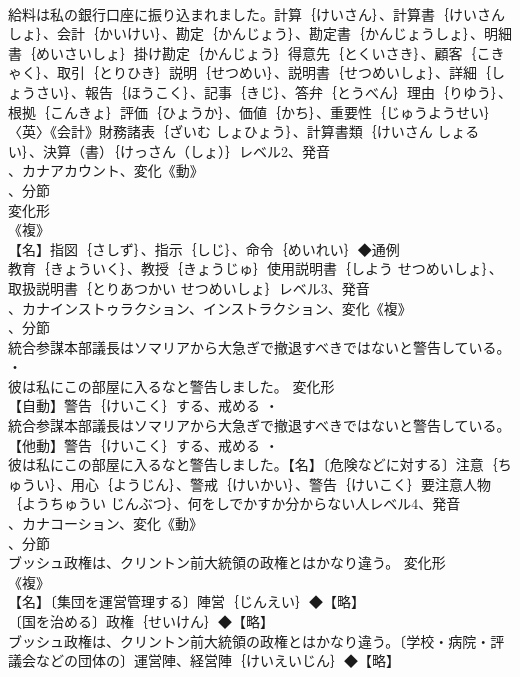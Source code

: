 \documentclass[8pt]{extreport}
\begin{document}
\begin{CJK}{UTF8}{min}
\\	給料は私の銀行口座に振り込まれました。計算｛けいさん｝、計算書｛けいさんしょ｝、会計｛かいけい｝、勘定｛かんじょう｝、勘定書｛かんじょうしょ｝、明細書｛めいさいしょ｝掛け勘定｛かんじょう｝得意先｛とくいさき｝、顧客｛こきゃく｝、取引｛とりひき｝説明｛せつめい｝、説明書｛せつめいしょ｝、詳細｛しょうさい｝、報告｛ほうこく｝、記事｛きじ｝、答弁｛とうべん｝理由｛りゆう｝、根拠｛こんきょ｝評価｛ひょうか｝、価値｛かち｝、重要性｛じゅうようせい｝
\\	〈英〉《会計》財務諸表｛ざいむ しょひょう｝、計算書類｛けいさん しょるい｝、決算（書）｛けっさん（しょ）｝レベル2、発音
\\	、カナアカウント、変化《動》
\\	、分節
\\	変化形 
\\	《複》
\\	【名】指図｛さしず｝、指示｛しじ｝、命令｛めいれい｝◆通例
\\	教育｛きょういく｝、教授｛きょうじゅ｝使用説明書｛しよう せつめいしょ｝、取扱説明書｛とりあつかい せつめいしょ｝レベル3、発音
\\	、カナインストゥラクション、インストラクション、変化《複》
\\	、分節
\\	統合参謀本部議長はソマリアから大急ぎで撤退すべきではないと警告している。 ・
\\	彼は私にこの部屋に入るなと警告しました。	変化形 
\\	【自動】警告｛けいこく｝する、戒める ・
\\	統合参謀本部議長はソマリアから大急ぎで撤退すべきではないと警告している。【他動】警告｛けいこく｝する、戒める ・
\\	彼は私にこの部屋に入るなと警告しました。【名】〔危険などに対する〕注意｛ちゅうい｝、用心｛ようじん｝、警戒｛けいかい｝、警告｛けいこく｝要注意人物｛ようちゅうい じんぶつ｝、何をしでかすか分からない人レベル4、発音
\\	、カナコーション、変化《動》
\\	、分節
\\	ブッシュ政権は、クリントン前大統領の政権とはかなり違う。	変化形 
\\	《複》
\\	【名】〔集団を運営管理する〕陣営｛じんえい｝◆【略】
\\	〔国を治める〕政権｛せいけん｝◆【略】
\\	ブッシュ政権は、クリントン前大統領の政権とはかなり違う。〔学校・病院・評議会などの団体の〕運営陣、経営陣｛けいえいじん｝◆【略】

\end{CJK}
\end{document}
